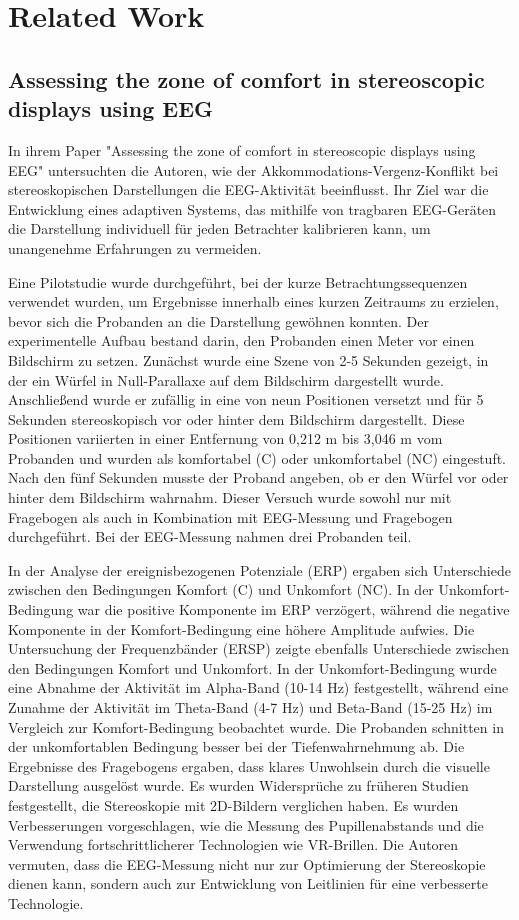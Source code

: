 \documentclass[conference]{IEEEtran}
\begin{document}
\section{Related Work}
\subsection{Assessing the zone of comfort in stereoscopic displays using EEG}
In ihrem Paper "Assessing the zone of comfort in stereoscopic displays using EEG" \cite{b1} untersuchten die Autoren, wie der Akkommodations-Vergenz-Konflikt bei stereoskopischen Darstellungen die EEG-Aktivität beeinflusst. Ihr Ziel war die Entwicklung eines adaptiven Systems, das mithilfe von tragbaren EEG-Geräten die Darstellung individuell für jeden Betrachter kalibrieren kann, um unangenehme Erfahrungen zu vermeiden.

Eine Pilotstudie wurde durchgeführt, bei der kurze Betrachtungssequenzen verwendet wurden, um Ergebnisse innerhalb eines kurzen Zeitraums zu erzielen, bevor sich die Probanden an die Darstellung gewöhnen konnten. Der experimentelle Aufbau bestand darin, den Probanden einen Meter vor einen Bildschirm zu setzen. Zunächst wurde eine Szene von 2-5 Sekunden gezeigt, in der ein Würfel in Null-Parallaxe auf dem Bildschirm dargestellt wurde. Anschließend wurde er zufällig in eine von neun Positionen versetzt und für 5 Sekunden stereoskopisch vor oder hinter dem Bildschirm dargestellt. Diese Positionen variierten in einer Entfernung von 0,212 m bis 3,046 m vom Probanden und wurden als komfortabel (C) oder unkomfortabel (NC) eingestuft. Nach den fünf Sekunden musste der Proband angeben, ob er den Würfel vor oder hinter dem Bildschirm wahrnahm. Dieser Versuch wurde sowohl nur mit Fragebogen als auch in Kombination mit EEG-Messung und Fragebogen durchgeführt. Bei der EEG-Messung nahmen drei Probanden teil.
 
In der Analyse der ereignisbezogenen Potenziale (ERP) ergaben sich Unterschiede zwischen den Bedingungen Komfort (C) und Unkomfort (NC). In der Unkomfort-Bedingung war die positive Komponente im ERP verzögert, während die negative Komponente in der Komfort-Bedingung eine höhere Amplitude aufwies. Die Untersuchung der Frequenzbänder (ERSP) zeigte ebenfalls Unterschiede zwischen den Bedingungen Komfort und Unkomfort. In der Unkomfort-Bedingung wurde eine Abnahme der Aktivität im Alpha-Band (10-14 Hz) festgestellt, während eine Zunahme der Aktivität im Theta-Band (4-7 Hz) und Beta-Band (15-25 Hz) im Vergleich zur Komfort-Bedingung beobachtet wurde. Die Probanden schnitten in der unkomfortablen Bedingung besser bei der Tiefenwahrnehmung ab. Die Ergebnisse des Fragebogens ergaben, dass klares Unwohlsein durch die visuelle Darstellung ausgelöst wurde. Es wurden Widersprüche zu früheren Studien festgestellt, die Stereoskopie mit 2D-Bildern verglichen haben. Es wurden Verbesserungen vorgeschlagen, wie die Messung des Pupillenabstands und die Verwendung fortschrittlicherer Technologien wie VR-Brillen. Die Autoren vermuten, dass die EEG-Messung nicht nur zur Optimierung der Stereoskopie dienen kann, sondern auch zur Entwicklung von Leitlinien für eine verbesserte Technologie.
\end{document}
